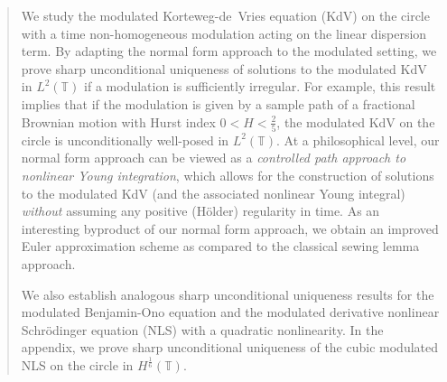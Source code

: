 \documentclass[letterpaper, 11pt,  reqno]{amsart}
\newcommand{\1}{\hspace{0.5mm}\text{I}\hspace{0.5mm}}
\newcommand{\T}{\mathbb{T}}
\numberwithin{equation}{section}
\numberwithin{theorem}{section}
\begin{document}
%













\begin{abstract}

We study the modulated  Korteweg-de~Vries equation (KdV)
on the circle
with a time non-homogeneous modulation acting on the linear dispersion term.
By adapting the normal form approach to the modulated setting, 
we prove sharp unconditional uniqueness
of solutions to the modulated KdV in $L^2(\T)$
if a modulation is  sufficiently irregular.
For example, this result implies that if the modulation is given by 
a sample path of a fractional Brownian motion 
with Hurst index $0 < H < \frac 25$, the modulated KdV on the circle is 
unconditionally well-posed in $L^2(\T)$.
At a philosophical level, 
our normal form approach can be viewed
as 
a {\it controlled path approach
to nonlinear Young integration}, 
which 
allows for 
 the construction of solutions
to the modulated KdV
(and the associated nonlinear Young integral)
{\it without} assuming any positive (H\"older) regularity in time.
As an interesting byproduct of our normal form approach, 
we  obtain an improved Euler approximation scheme 
as compared to the classical sewing lemma approach.





We also establish analogous sharp unconditional uniqueness results
for the modulated Benjamin-Ono equation
and the modulated derivative nonlinear Schr\"odinger equation (NLS)
with a quadratic nonlinearity.
In the appendix, 
we 
prove sharp unconditional uniqueness 
of the cubic modulated NLS on the circle in $H^{\frac 16}(\T)$.





\end{abstract}
\end{document}
